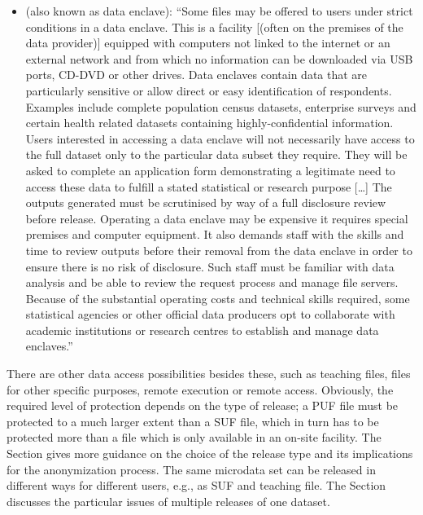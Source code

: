 \documentclass[letterpaper,10pt,english]{sphinxmanual}
\begin{document}
\begin{itemize}
\item {} 
 (also
known as data enclave): “Some files may be offered to users under
strict conditions in a data enclave. This is a facility {[}(often on
the premises of the data provider){]} equipped with computers not
linked to the internet or an external network and from which no
information can be downloaded via USB ports, CD-DVD or other drives.
Data enclaves contain data that are particularly sensitive or allow
direct or easy identification of respondents. Examples include
complete population census datasets, enterprise surveys and certain
health related datasets containing highly-confidential information.
Users interested in accessing a data enclave will not necessarily
have access to the full dataset \textendash{} only to the particular data subset
they require. They will be asked to complete an application form
demonstrating a legitimate need to access these data to fulfill a
stated statistical or research purpose {[}…{]} The outputs generated must
be scrutinised by way of a full disclosure review before release.
Operating a data enclave may be expensive \textendash{} it requires special
premises and computer equipment. It also demands staff with the
skills and time to review outputs before their removal from the data
enclave in order to ensure there is no risk of disclosure. Such staff
must be familiar with data analysis and be able to review the request
process and manage file servers. Because of the substantial operating
costs and technical skills required, some statistical agencies or
other official data producers opt to collaborate with academic
institutions or research centres to establish and manage data
enclaves.”

\end{itemize}

There are other data access possibilities besides these, such as
teaching files, files for other specific purposes, remote execution or
remote access. Obviously, the required level of protection depends on
the type of release; a PUF file must be protected to a much larger
extent than a SUF file, which in turn has to be protected more than a
file which is only available in an on-site facility.
The Section  gives
more guidance on the choice of the release type and its implications for
the anonymization process. The same microdata set can be released in
different ways for different users, e.g., as SUF and teaching file.
The Section  discusses the particular issues of multiple releases of one
dataset.
\end{document}
